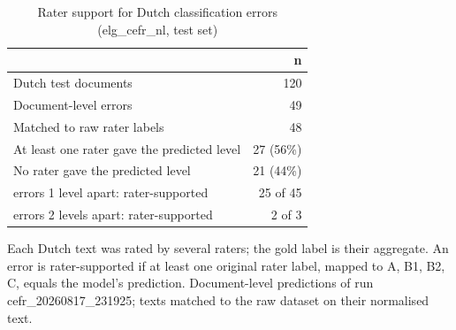 \begin{table}[htbp]
\centering
\begin{threeparttable}
\caption{Rater support for Dutch classification errors (elg\_cefr\_nl, test set)}
\label{tab:clf-rater-nl}
\begin{tabular}{lr}
\hline
 & n \\
\hline
Dutch test documents & 120 \\
Document-level errors & 49 \\
Matched to raw rater labels & 48 \\
\hline
At least one rater gave the predicted level & 27 (56\%) \\
No rater gave the predicted level & 21 (44\%) \\
\quad errors 1 level apart: rater-supported & 25 of 45 \\
\quad errors 2 levels apart: rater-supported & 2 of 3 \\
\hline
\end{tabular}
\begin{tablenotes}
\footnotesize
\item Each Dutch text was rated by several raters; the gold label is their aggregate. An error is rater-supported if at least one original rater label, mapped to A, B1, B2, C, equals the model's prediction. Document-level predictions of run cefr\_20260817\_231925; texts matched to the raw dataset on their normalised text.
\end{tablenotes}
\end{threeparttable}
\end{table}
